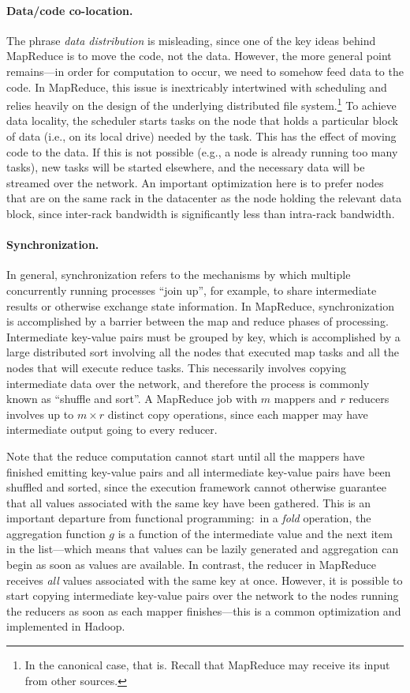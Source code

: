 \paragraph{Data/code co-location.}  The phrase \emph{data
  distribution} is misleading, since one of the key ideas behind
MapReduce is to move the code, not the data.  However, the more
general point remains---in order for computation to occur, we need to
somehow feed data to the code.  In MapReduce, this issue is
inextricably intertwined with scheduling and relies heavily on the
design of the underlying distributed file system.\footnote{In the
canonical case, that is.  Recall that MapReduce may receive its input
from other sources.} To achieve data locality, the scheduler starts
tasks on the node that holds a particular block of data (i.e., on its
local drive) needed by the task.  This has the effect of moving code
to the data.  If this is not possible (e.g., a node is already running
too many tasks), new tasks will be started elsewhere, and the
necessary data will be streamed over the network.  An important
optimization here is to prefer nodes that are on the same rack in the
datacenter as the node holding the relevant data block, since
inter-rack bandwidth is significantly less than intra-rack bandwidth.

\paragraph{Synchronization.} In general, synchronization refers to
the mechanisms by which multiple concurrently running processes ``join
up'', for example, to share intermediate results or otherwise exchange
state information.  In MapReduce, synchronization is accomplished by a
barrier between the map and reduce phases of processing.  Intermediate
key-value pairs must be grouped by key, which is accomplished by a
large distributed sort involving all the nodes that executed map tasks
and all the nodes that will execute reduce tasks.  This necessarily
involves copying intermediate data over the network, and therefore the
process is commonly known as ``shuffle and sort''.  A MapReduce job
with $m$ mappers and $r$ reducers involves up to $m \times r$ distinct
copy operations, since each mapper may have intermediate output going
to every reducer.

Note that the reduce computation cannot start until all the mappers
have finished emitting key-value pairs and all intermediate key-value
pairs have been shuffled and sorted, since the execution framework
cannot otherwise guarantee that all values associated with the same
key have been gathered.  This is an important departure from
functional programming:\ in a \emph{fold} operation, the aggregation
function $g$ is a function of the intermediate value and the next item
in the list---which means that values can be lazily generated and
aggregation can begin as soon as values are available.  In contrast,
the reducer in MapReduce receives \emph{all} values associated with the
same key at once.  However, it is possible to start copying
intermediate key-value pairs over the network to the nodes running the
reducers as soon as each mapper finishes---this is a common
optimization and implemented in Hadoop.


